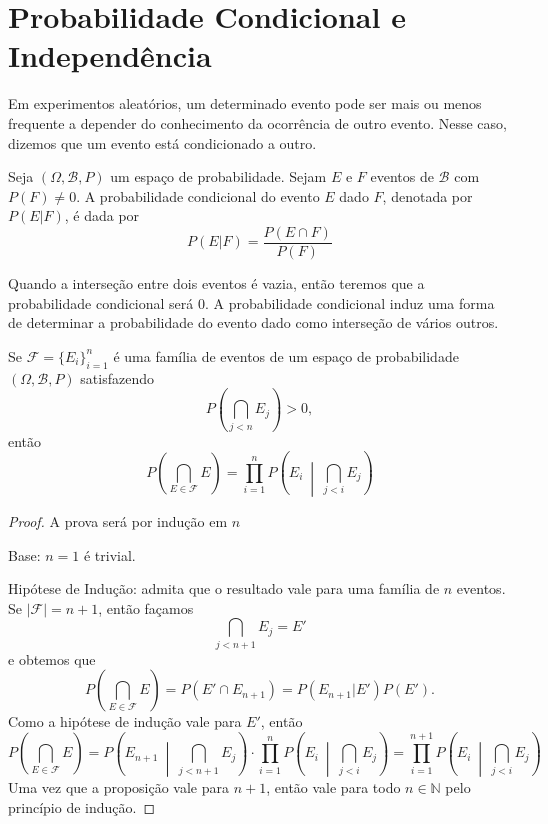 \section{Probabilidade Condicional e Independência}

Em experimentos aleatórios, um determinado evento pode ser mais ou menos frequente a
depender do conhecimento da ocorrência de outro evento. Nesse caso, dizemos que um evento
está condicionado a outro.

\begin{def:probabilidade condicional}
Seja $(\Omega, \mathcal{B}, P)$ um espaço de probabilidade.
Sejam $E$ e $F$ eventos de $\mathcal{B}$ com $P(F) \ne 0$.
A probabilidade condicional do evento $E$ dado $F$, denotada por $P(E|F)$, é dada por
\[
	P(E|F) = \frac{P(E \cap F)}{P(F)}
\]
\end{def:probabilidade condicional}


Quando a interseção entre dois eventos é vazia, então teremos que a probabilidade
condicional será $0$.
A probabilidade condicional induz uma forma de determinar a probabilidade do evento
dado como interseção de vários outros.

\begin{prop:regra da multiplicacao}
Se $\mathcal{F} = \{E_i\}_{i=1}^n$ é uma família de eventos de um espaço de probabilidade
$(\Omega, \mathcal{B}, P)$ satisfazendo
\[
    P\left(\bigcap_{j<n} E_j\right) > 0,
\]
então
\[
	P\left(\bigcap_{E \in \mathcal{F}} E\right) =
	\prod_{i=1}^n P\left(E_i\ \middle|\ \bigcap_{j < i} E_j\right)
\]
\begin{proof}
	A prova será por indução em $n$

	Base: $n = 1$ é trivial.

	Hipótese de Indução: admita que o resultado vale para uma família de $n$ eventos. Se
	$|\mathcal{F}| = n + 1$, então façamos
	\[
		\bigcap_{j < n+1} E_j  = E'
	\]
	e obtemos que
	\[
		P\left(\bigcap_{E \in \mathcal{F}} E\right) = P(E' \cap E_{n+1}) = P(E_{n+1} | E') P(E').
	\]
	Como a hipótese de indução vale para $E'$, então
	\[
		P\left(\bigcap_{E \in \mathcal{F}} E\right) =
		P\left(E_{n+1}\ \middle|\ \bigcap_{j < n+1} E_j\right) \cdot
		\prod_{i=1}^n P\left(E_i\ \middle|\ \bigcap_{j < i} E_j\right) =
		\prod_{i=1}^{n+1} P\left(E_i\ \middle|\ \bigcap_{j < i} E_j\right)
	\]
	Uma vez que a proposição vale para $n+1$, então vale para todo $n \in \mathbb{N}$
	pelo princípio de indução.
\end{proof}
\end{prop:regra da multiplicacao}

